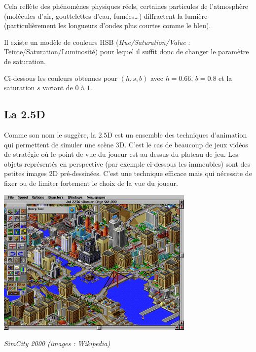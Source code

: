 \documentclass[11pt,class=report,crop=false]{standalone}
\begin{document}
Cela reflète des phénomènes physiques réels, certaines particules de l'atmosphère (molécules d'air, gouttelettes d'eau, fumées\ldots) diffractent la lumière (particulièrement les longueurs d'ondes plus courtes comme le bleu).



Il existe un modèle de couleurs HSB (\emph{Hue/Saturation/Value} : Teinte/Saturation/Luminosité) pour lequel il suffit donc de changer le paramètre de saturation.

Ci-dessous les couleurs obtenues pour $(h,s,b)$ avec $h=0.66$, $b=0.8$ et la saturation $s$ variant de $0$ à $1$.

\subsection{La 2.5D}

Comme son nom le suggère, la 2.5D est un ensemble des techniques d'animation qui permettent de simuler une scène 3D. C'est le cas de beaucoup de jeux vidéos de stratégie où le point de vue du joueur est au-dessus du plateau de jeu. Les objets représentés en perspective (par exemple ci-dessous les immeubles) sont des petites images 2D pré-dessinées.
C'est une technique efficace mais qui nécessite de fixer ou de limiter fortement le choix de la vue du joueur.
   
\begin{center}
	\includegraphics[scale=\myscale,scale=0.6]{figures/simcity}
	
	\emph{SimCity 2000 (images : Wikipedia)}
\end{center}

\end{document}
